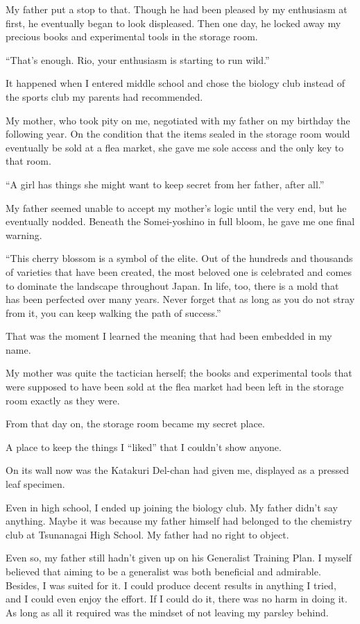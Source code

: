 \documentclass[
    a4paper,
    12pt,
    twoside,
    openany,
    UTF8,
    fontset=windows
]{ctexbook}
\begin{document}
My father put a stop to that. Though he had been pleased by my enthusiasm at first, he eventually began to look displeased. Then one day, he locked away my precious books and experimental tools in the storage room.

``That's enough. Rio, your enthusiasm is starting to run wild.''

It happened when I entered middle school and chose the biology club instead of the sports club my parents had recommended.

My mother, who took pity on me, negotiated with my father on my birthday the following year. On the condition that the items sealed in the storage room would eventually be sold at a flea market, she gave me sole access and the only key to that room.

``A girl has things she might want to keep secret from her father, after all.''

My father seemed unable to accept my mother's logic until the very end, but he eventually nodded. Beneath the Somei-yoshino in full bloom, he gave me one final warning.

``This cherry blossom is a symbol of the elite. Out of the hundreds and thousands of varieties that have been created, the most beloved one is celebrated and comes to dominate the landscape throughout Japan. In life, too, there is a mold that has been perfected over many years. Never forget that as long as you do not stray from it, you can keep walking the path of success.''

That was the moment I learned the meaning that had been embedded in my name.

My mother was quite the tactician herself; the books and experimental tools that were supposed to have been sold at the flea market had been left in the storage room exactly as they were.

From that day on, the storage room became my secret place.

A place to keep the things I ``liked'' that I couldn't show anyone.

On its wall now was the Katakuri Del-chan had given me, displayed as a pressed leaf specimen.

Even in high school, I ended up joining the biology club. My father didn't say anything. Maybe it was because my father himself had belonged to the chemistry club at Tsunanagai High School. My father had no right to object.

Even so, my father still hadn't given up on his Generalist Training Plan. I myself believed that aiming to be a generalist was both beneficial and admirable. Besides, I was suited for it. I could produce decent results in anything I tried, and I could even enjoy the effort. If I could do it, there was no harm in doing it. As long as all it required was the mindset of not leaving my parsley behind.
\end{document}
